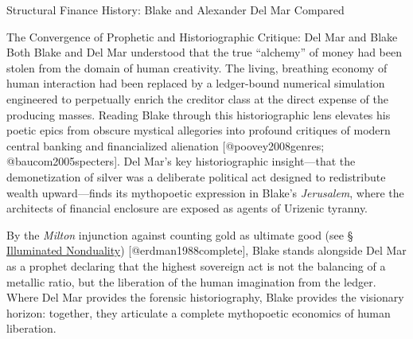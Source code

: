 \documentclass[
  ignorenonframetext,
]{beamer}
\begin{document}
\begin{frame}{Structural Finance History: Blake and Alexander Del Mar
Compared}
\begin{block}{The Convergence of Prophetic and Historiographic Critique:
Del Mar and Blake}
\protect{}\label{the-convergence-of-prophetic-and-historiographic-critique-del-mar-and-blake}
Both Blake and Del Mar understood that the true ``alchemy'' of money had
been stolen from the domain of human creativity. The living, breathing
economy of human interaction had been replaced by a ledger-bound
numerical simulation engineered to perpetually enrich the creditor class
at the direct expense of the producing masses. Reading Blake through
this historiographic lens elevates his poetic epics from obscure
mystical allegories into profound critiques of modern central banking
and financialized alienation {[}@poovey2008genres;
@baucom2005specters{]}. Del Mar's key historiographic insight---that the
demonetization of silver was a deliberate political act designed to
redistribute wealth upward---finds its mythopoetic expression in Blake's
\emph{Jerusalem}, where the architects of financial enclosure are
exposed as agents of Urizenic tyranny.

By the \emph{Milton} injunction against counting gold as ultimate good
(see \hyperlink{sec-illuminated-nonduality}{§ Illuminated Nonduality})
{[}@erdman1988complete{]}, Blake stands alongside Del Mar as a prophet
declaring that the highest sovereign act is not the balancing of a
metallic ratio, but the liberation of the human imagination from the
ledger. Where Del Mar provides the forensic historiography, Blake
provides the visionary horizon: together, they articulate a complete
mythopoetic economics of human liberation.
\end{block}
\end{frame}
\end{document}

